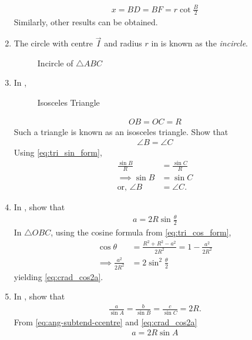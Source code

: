 \begin{enumerate}[label=\thesection.\arabic*.,ref=\thesection.\theenumi]
		\begin{align}
			x = BD = BF = r \cot \frac{B}{2}
		\end{align}
		Similarly, other results can be obtained.
\item The circle with centre $\vec{I}$ and radius $r$ in  
is known as the {\em incircle}. 
\begin{figure}[!ht]
	\begin{center}
		\resizebox{0.6\columnwidth}{!}{}
	\end{center}
	\caption{Incircle of $\triangle ABC$}
	\label{fig:tri_icircle}	
\end{figure}
\item In 
	,	
\begin{figure}[!ht]
	\begin{center}
		\resizebox{0.6\columnwidth}{!}{}
	\end{center}
	\caption{Isosceles Triangle}
	\label{fig:tri-isosc}	
\end{figure}
\begin{align}
	OB = OC=R
\end{align}
Such a triangle is known as an isosceles triangle.  Show that
\begin{align}
	\angle B = \angle C
\end{align}
\solution 
Using
\eqref{eq:tri_sin_form},
\begin{align}
	\frac{\sin B}{R} &= \frac{\sin C}{R}
	\\
\implies	{\sin B} &= {\sin C}
\\
	\text{or, } \angle B &= \angle C.
\end{align}
\item In 
	,	
	show that 
  \begin{align}
	  a = 2R \sin\frac{ \theta }{2}
\label{eq:crad_cos2a}
  \end{align}
		\solution In $\triangle OBC$,  using the cosine formula from
\eqref{eq:tri_cos_form},
\begin{align}
	\cos \theta &= \frac{R^2+R^2 - a^2}{2R^2} = 1 -\frac{a^2}{2R^2}
	\\
	\implies \frac{a^2}{2R^2}&= 2\sin^2\frac{\theta}{2}
\end{align}
yielding 
\eqref{eq:crad_cos2a}.
\item In
	,
show that 
\begin{align}
\label{eq:tri_crad_R}
\frac{a}{\sin A} = \frac{b}{\sin B} = \frac{c}{\sin C} = 2R.
\end{align}
%
%
\solution
From 
\eqref{eq:ang-subtend-ccentre}
and 
\eqref{eq:crad_cos2a}
  \begin{align}
	  a = 2R \sin A
  \end{align}


\end{enumerate}
